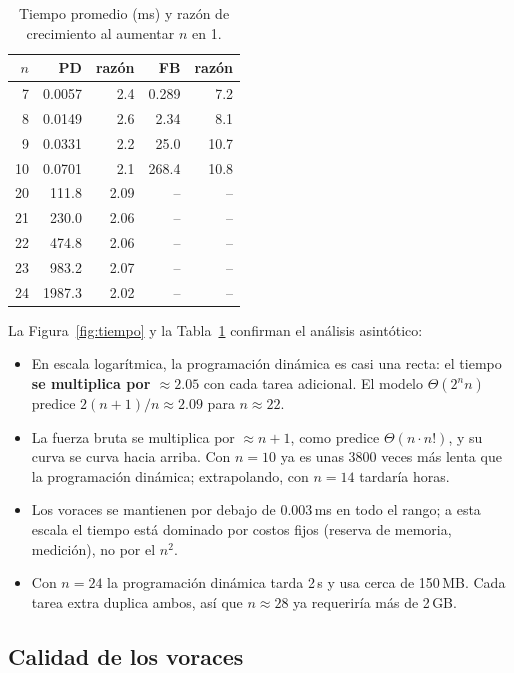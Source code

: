 \documentclass[10pt,twocolumn,letterpaper]{article}
\begin{document}
\begin{table}[h]
\centering
\caption{Tiempo promedio (ms) y razón de crecimiento al aumentar $n$ en 1.}\label{tab:tiempo}
\small
\begin{tabular}{rrrrr}
\toprule
$n$ & PD & razón & FB & razón\\
\midrule
7 & 0.0057 & 2.4 & 0.289 & 7.2\\
8 & 0.0149 & 2.6 & 2.34 & 8.1\\
9 & 0.0331 & 2.2 & 25.0 & 10.7\\
10 & 0.0701 & 2.1 & 268.4 & 10.8\\
\midrule
20 & 111.8 & 2.09 & -- & --\\
21 & 230.0 & 2.06 & -- & --\\
22 & 474.8 & 2.06 & -- & --\\
23 & 983.2 & 2.07 & -- & --\\
24 & 1987.3 & 2.02 & -- & --\\
\bottomrule
\end{tabular}
\end{table}

La Figura~\ref{fig:tiempo} y la Tabla~\ref{tab:tiempo} confirman el análisis
asintótico:
\begin{itemize}
  \item En escala logarítmica, la programación dinámica es casi una recta: el
        tiempo \textbf{se multiplica por $\approx2.05$} con cada tarea
        adicional. El modelo $\Theta(2^n n)$ predice
        $2(n+1)/n\approx2.09$ para $n\approx22$.
  \item La fuerza bruta se multiplica por $\approx n+1$, como predice
        $\Theta(n\cdot n!)$, y su curva se curva hacia arriba. Con $n=10$ ya es
        unas 3800 veces más lenta que la programación dinámica; extrapolando,
        con $n=14$ tardaría horas.
  \item Los voraces se mantienen por debajo de $0.003$\,ms en todo el rango;
        a esta escala el tiempo está dominado por costos fijos (reserva de
        memoria, medición), no por el $n^2$.
  \item Con $n=24$ la programación dinámica tarda 2\,s y usa cerca de
        150\,MB. Cada tarea extra duplica ambos, así que $n\approx28$ ya
        requeriría más de 2\,GB.
\end{itemize}

\subsection{Calidad de los voraces}
\end{document}
